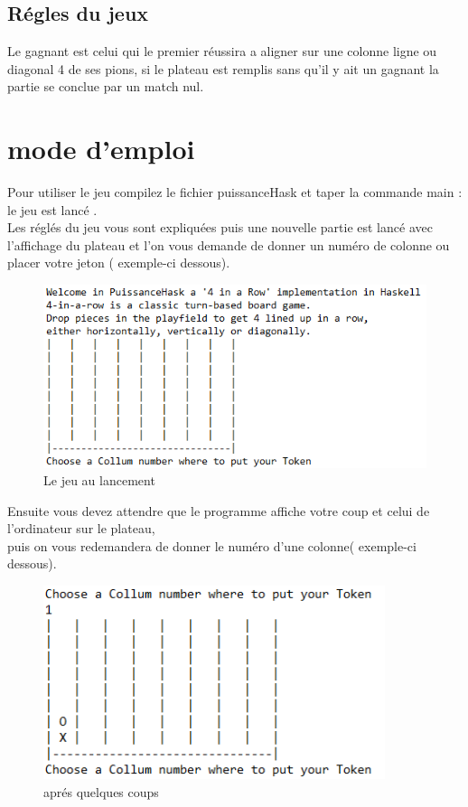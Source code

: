 \documentclass[a4paper]{article}
\begin{document}
\subsection{Régles du jeux}
Le gagnant est celui qui le premier réussira a aligner sur une colonne ligne ou diagonal 4 de ses pions, si le plateau est remplis sans qu'il y ait un gagnant la partie se conclue  par un match nul.
\newpage
\section{mode d'emploi} %
Pour utiliser le jeu compilez le fichier puissanceHask et taper la commande main : le jeu est lancé .\\
Les réglés du jeu vous sont expliquées puis une nouvelle partie est lancé avec l'affichage du plateau et l'on vous demande de donner un numéro de colonne ou placer votre jeton ( exemple-ci dessous).

\begin{figure}[!h] %
	\includegraphics[width=14cm]{lancement}
		\caption{Le jeu au lancement}
	\end{figure}

Ensuite vous devez attendre que le programme affiche votre coup et celui de l'ordinateur sur le plateau,\\
puis on vous redemandera de donner le numéro d'une colonne( exemple-ci dessous).\\

\begin{figure}[!h] %
	\includegraphics[width=10cm]{coup}
		\caption{aprés quelques coups}
	\end{figure}
\end{document}
